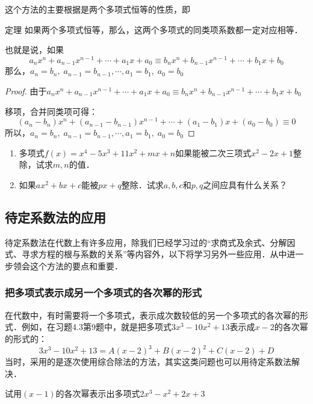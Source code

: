 这个方法的主要根据是两个多项式恒等的性质，即

\begin{blk}{定理}
    如果两个多项式恒等，那么，这两个多项式的同类项系数都一定对应相等．
\end{blk}

也就是说，如果 
$$a_nx^n+a_{n-1}x^{n-1}+\cdots+a_1x+a_0\equiv b_nx^n+b_{n-1}x^{n-1}+\cdots+b_1x+b_0$$
那么，$a_n=b_n,\; a_{n-1}=b_{n-1},\cdots, a_1=b_1,\; a_0=b_0$

\begin{proof}
由于$a_nx^n+a_{n-1}x^{n-1}+\cdots+a_1x+a_0\equiv b_nx^n+b_{n-1}x^{n-1}+\cdots+b_1x+b_0$

移项，合并同类项可得：
\[(a_n-b_n)x^n+(a_{n-1}-b_{n-1})x^{n-1}+\cdots + (a_1-b_1)x+(a_0-b_0)\equiv 0\]
所以，$a_n=b_n,\; a_{n-1}=b_{n-1},\cdots, a_1=b_1,\; a_0=b_0$
\end{proof}

\begin{ex}
\begin{enumerate}
\item  多项式$f(x)=x^4-5x^3+11x^2+mx+n$如果能被二次三项式$x^2-2x+1$整除，试求$m,n$的值．
\item  如果$ax^2+bx+c$能被$px+q$整除．试求$a,b,c$和$p,q$之间应具有什么关系？
\end{enumerate}

\end{ex}

\subsection{待定系数法的应用}
待定系数法在代数上有许多应用，除我们已经学习过的“求商式及余式、分解因式、寻求方程的根与系数的关系”等内容外，以下将学习另外一些应用．从中进一步领会这个方法的要点和重要．

\subsubsection{把多项式表示成另一个多项式的各次幂的形式}

在代数中，有时需要将一个多项式，表示成次数较低的另一个多项式的各次幂的形式．例如，在习题4.3第9题中，就是把多项式$3x^3-10x^2+13$表示成$x-2$的各次幂的形式的：
\[3x^3-10x^2+13=A (x-2)^3 +B (x-2)^2+ C (x-2) +D\]
当时，采用的是逐次使用综合除法的方法，其实这类问题也可以用待定系数法解决．


\begin{example}
试用$(x-1)$的各次幂表示出多项式$2x^3-x^2+2x+3$
\end{example}


